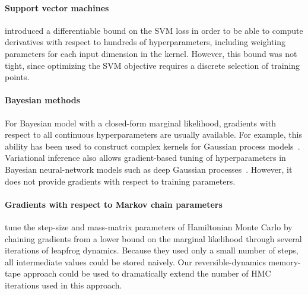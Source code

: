 \documentclass{article}
\begin{document}
\paragraph{Support vector machines}
\citet{chapelle2002choosing} 
 introduced a differentiable bound on the SVM loss in order to be able to compute derivatives with respect to hundreds of hyperparameters, including weighting parameters for each input dimension in the kernel.
However, this bound was not tight, since optimizing the SVM objective requires a discrete selection of training points.

\paragraph{Bayesian methods}
For Bayesian model with a closed-form marginal likelihood, gradients with respect to all continuous hyperparameters are usually available.
For example, this ability has been used to construct complex kernels for Gaussian process models~\citep[Chapter 5]{rasmussen38gaussian}.
Variational inference also allows gradient-based tuning of hyperparameters in Bayesian neural-network models such as deep Gaussian processes~\citep{deepGPVar14}.
However, it does not provide gradients with respect to training parameters.


\paragraph{Gradients with respect to Markov chain parameters}
\citet{Bridging14} tune the step-size and mass-matrix parameters of Hamiltonian Monte Carlo by chaining gradients from a lower bound on the marginal likelihood through several iterations of leapfrog dynamics.
Because they used only a small number of steps, all intermediate values could be stored naively.
Our reversible-dynamics memory-tape approach could be used to dramatically extend the number of HMC iterations used in this approach.
\end{document}
